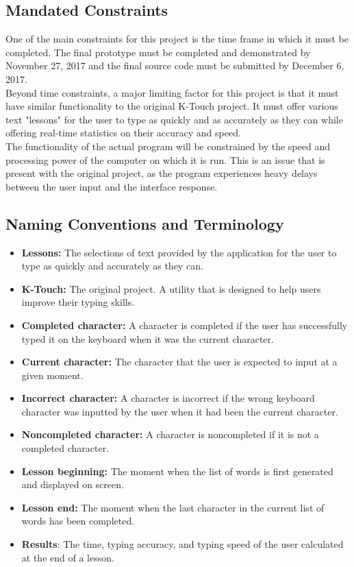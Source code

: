 \documentclass[12pt, titlepage]{article}
\begin{document}
\subsection{Mandated Constraints}
\indent \indent One of the main constraints for this project is the time frame in which it must be completed. The final prototype must be completed and demonstrated by November 27, 2017 and the final source code must be submitted by December 6, 2017.
\\
\indent Beyond time constraints, a major limiting factor for this project is that it must have similar functionality to the original K-Touch project. It must offer various text "lessons" for the user to type as quickly and as accurately as they can while offering real-time statistics on their accuracy and speed. 
\\
\indent The functionality of the actual program will be constrained by the speed and processing power of the computer on which it is run. This is an issue that is present with the original project, as the program experiences heavy delays between the user input and the interface response.


\subsection{Naming Conventions and Terminology}

\begin{itemize}
    \item \textbf{Lessons:} The selections of text provided by the application for the user to type as quickly and accurately as they can.
    \item \textbf{K-Touch:} The original project. A utility that is designed to help users improve their typing skills.
    \item\textbf{Completed character:} A character is completed if the user has successfully typed it on the keyboard when it was the current character. 
    \item \textbf{Current character:} The character that the user is expected to input at a given moment.
    \item\textbf{Incorrect character:} A character is incorrect if the wrong keyboard character was inputted by the user when it had been the current character.
    \item\textbf{Noncompleted character:} A character is noncompleted if it is not a completed character.
    \item \textbf{Lesson beginning:} The moment when the list of words is first generated and displayed on screen.
    \item \textbf{Lesson end:} The moment when the last character in the current list of words has been completed.
    \item \textbf{Results}: The time, typing accuracy, and typing speed of the user calculated at the end of a lesson.
\end{itemize}
\end{document}
